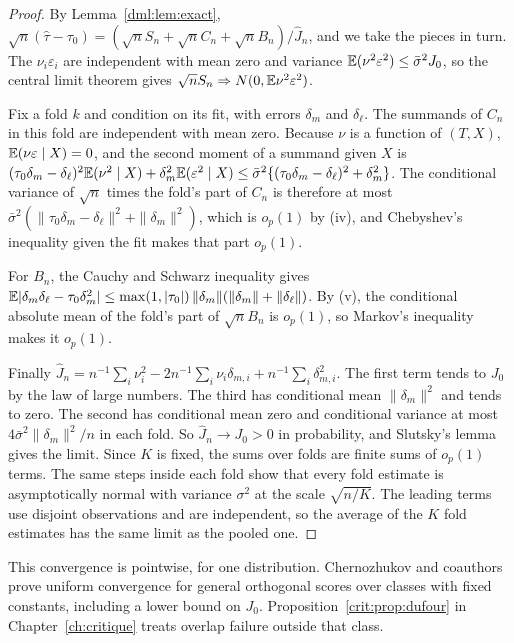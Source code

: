 \begin{proof}
By Lemma~\ref{dml:lem:exact}, $\sqrt{n}(\hat\tau - \tau_0) = (\sqrt{n}S_n + \sqrt{n}C_n + \sqrt{n}B_n)/\hat J_n$, and we take the pieces in turn. The $\nu_i\varepsilon_i$ are independent with mean zero and variance $\mathbb{E}(\nu^2\varepsilon^2) \le \bar\sigma^2 J_0$, so the central limit theorem gives $\sqrt{n}S_n \Rightarrow N(0, \mathbb{E}\nu^2\varepsilon^2)$.

Fix a fold $k$ and condition on its fit, with errors $\delta_m$ and $\delta_\ell$. The summands of $C_n$ in this fold are independent with mean zero. Because $\nu$ is a function of $(T, X)$, $\mathbb{E}(\nu\varepsilon \mid X) = 0$, and the second moment of a summand given $X$ is $(\tau_0\delta_m - \delta_\ell)^2\mathbb{E}(\nu^2 \mid X) + \delta_m^2\mathbb{E}(\varepsilon^2 \mid X) \le \bar\sigma^2\{(\tau_0\delta_m - \delta_\ell)^2 + \delta_m^2\}$. The conditional variance of $\sqrt{n}$ times the fold's part of $C_n$ is therefore at most $\bar\sigma^2(\|\tau_0\delta_m - \delta_\ell\|^2 + \|\delta_m\|^2)$, which is $o_p(1)$ by (iv), and Chebyshev's inequality given the fit makes that part $o_p(1)$.

For $B_n$, the Cauchy and Schwarz inequality gives $\mathbb{E}|\delta_m\delta_\ell - \tau_0\delta_m^2| \le \max(1, |\tau_0|)\,\|\delta_m\|(\|\delta_m\| + \|\delta_\ell\|)$. By (v), the conditional absolute mean of the fold's part of $\sqrt{n}B_n$ is $o_p(1)$, so Markov's inequality makes it $o_p(1)$.

Finally $\hat J_n = n^{-1}\sum_i\nu_i^2 - 2n^{-1}\sum_i\nu_i\delta_{m,i} + n^{-1}\sum_i\delta_{m,i}^2$. The first term tends to $J_0$ by the law of large numbers. The third has conditional mean $\|\delta_m\|^2$ and tends to zero. The second has conditional mean zero and conditional variance at most $4\bar\sigma^2\|\delta_m\|^2/n$ in each fold. So $\hat J_n \to J_0 > 0$ in probability, and Slutsky's lemma gives the limit. Since $K$ is fixed, the sums over folds are finite sums of $o_p(1)$ terms. The same steps inside each fold show that every fold estimate is asymptotically normal with variance $\sigma^2$ at the scale $\sqrt{n/K}$. The leading terms use disjoint observations and are independent, so the average of the $K$ fold estimates has the same limit as the pooled one.
\end{proof}

This convergence is pointwise, for one distribution. Chernozhukov and coauthors prove uniform convergence for general orthogonal scores over classes with fixed constants, including a lower bound on $J_0$. Proposition~\ref{crit:prop:dufour} in Chapter~\ref{ch:critique} treats overlap failure outside that class.


